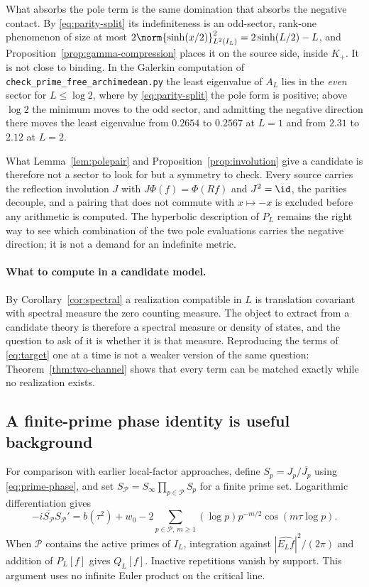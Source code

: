 What absorbs the pole term is the same domination that absorbs the negative
contact. By \eqref{eq:parity-split} its indefiniteness is an odd-sector,
rank-one phenomenon of size at most
$2\norm{\sinh(x/2)}_{L^2(I_L)}^2=2\sinh(L/2)-L$, and
Proposition~\ref{prop:gamma-compression} places it on the source side, inside
$K_+$. It is not close to binding. In the Galerkin computation of
\texttt{check\_prime\_free\_archimedean.py} the least eigenvalue of $A_L$ lies
in the \emph{even} sector for $L\leq\log2$, where by \eqref{eq:parity-split}
the pole form is positive; above $\log2$ the minimum moves to the odd sector,
and admitting the negative direction there moves the least eigenvalue from
$0.2654$ to $0.2567$ at $L=1$ and from $2.31$ to $2.12$ at $L=2$.

What Lemma~\ref{lem:polepair} and Proposition~\ref{prop:involution} give a
candidate is therefore not a sector to look for but a symmetry to check. Every
source carries the reflection involution $J$ with $J\Phi(f)=\Phi(Rf)$ and
$J^2=\id$, the parities decouple, and a pairing that does not commute with
$x\mapsto-x$ is excluded before any arithmetic is computed. The hyperbolic
description of $P_L$ remains the right way to see which combination of the two
pole evaluations carries the negative direction; it is not a demand for an
indefinite metric.

\paragraph{What to compute in a candidate model.}
By Corollary~\ref{cor:spectral} a realization compatible in $L$ is
translation covariant with spectral measure the zero counting measure. The
object to extract from a candidate theory is therefore a spectral measure or
density of states, and the question to ask of it is whether it is that
measure. Reproducing the terms of \eqref{eq:target} one at a time is not a
weaker version of the same question: Theorem~\ref{thm:two-channel} shows that
every term can be matched exactly while no realization exists.

\subsection{A finite-prime phase identity is useful background}
For comparison with earlier local-factor approaches, define
$S_p=J_p/\overline{J_p}$ using \eqref{eq:prime-phase}, and set
$S_{\mathcal P}=S_\infty\prod_{p\in\mathcal P}S_p$ for a finite prime
set. Logarithmic differentiation gives
\begin{equation}\label{eq:finite-phase}
 -i\overline{S_{\mathcal P}}S_{\mathcal P}'
 =b(\tau^2)+w_0
 -2\sum_{p\in\mathcal P,\,m\geq1}(\log p)p^{-m/2}
                         \cos(m\tau\log p).
\end{equation}
When $\mathcal P$ contains the active primes of $I_L$, integration
against $|\widehat{E_Lf}|^2/(2\pi)$ and addition of $P_L[f]$ gives
$Q_L[f]$. Inactive repetitions vanish by support. This argument uses
no infinite Euler product on the critical line.

